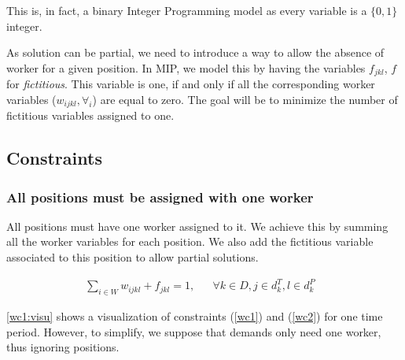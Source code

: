 \documentclass[../../thesis.tex]{subfiles}
\begin{document}
This is, in fact, a binary Integer Programming model as every variable is a $\{0, 1\}$ integer.

As solution can be partial, we need to introduce a way to allow the absence of worker for a 
given position. In MIP, we model this by having the variables $f_{jkl}$, $f$ for \emph{fictitious}. This variable is one, if and only if all the 
corresponding worker variables ($w_{ijkl}, \forall_i$) are equal to zero. The goal will be to minimize 
the number of fictitious variables assigned to one.

\subsection{Constraints}

\subsubsection{All positions must be assigned with one worker}

  All positions must have one worker assigned to it. We achieve this by summing all the worker variables 
  for each position. We also add the fictitious variable associated to this position to allow partial 
  solutions.

  \begin{align}
    \sum_{i \in W} w_{ijkl} + f_{jkl} = 1, && \forall k \in D, j \in d_k^T, l \in d_k^P & \label{wc1}
  \end{align}


\autoref{wc1:visu} shows a visualization of constraints (\ref{wc1}) and (\ref{wc2}) for one time period.
However, to simplify, we suppose that demands only need one worker, thus ignoring positions.
\end{document}
